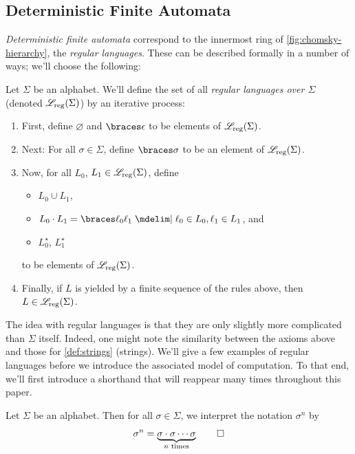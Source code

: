 \documentclass{fkpaper}
\newcommand{\lreg}{\ensuremath{\ms L_{\rm reg}}}
\begin{document}
\begin{multicols}{2}
\subsection{Deterministic Finite Automata}
\emph{Deterministic finite automata} correspond to the innermost ring
of \cref{fig:chomsky-hierarchy}, the \emph{regular languages}. These
can be described formally in a number of ways; we'll choose the
following:
\begin{definition}\label{def:regular-language}
  Let $\Sigma$ be an alphabet. We'll define the set of all
  \emph{regular languages over $\Sigma$} (denoted $\lreg(\Sigma)$) by
  an iterative process:
  \begin{enumerate}
    \item First, define $\varnothing$ and $\set{\epsilon}$ to be
      elements of $\lreg(\Sigma)$.
    \item Next: For all $\sigma \in \Sigma$, define $\set{\sigma}$ to
      be an element of $\lreg(\Sigma)$.
    \item Now, for all $L_0$, $L_1 \in \lreg(\Sigma)$, define
      \begin{itemize}
        \item $L_0 \cup L_1$, %
        \item $L_0 \cdot L_1 = \set{\ell_0 \ell_1 \MID \ell_0 \in L_0,
          \ell_1 \in L_1}$, and
        \item $L_0^\star$, $L_1^\star$
      \end{itemize}
      to be elements of $\lreg(\Sigma)$.
    \item Finally, if $L$ is yielded by a finite sequence of the
      rules above, then $L \in \lreg(\Sigma)$. \qedhere
  \end{enumerate}
\end{definition}
The idea with regular languages is that they are only slightly more
complicated than $\Sigma$ itself. Indeed, one might note the
similarity between the axioms above and those for \cref{def:strings}
(strings). We'll give a few examples of regular languages before we
introduce the associated model of computation. To that end, we'll
first introduce a shorthand that will reappear many times throughout
this paper.
\begin{definition}
  Let $\Sigma$ be an alphabet. Then for all $\sigma \in \Sigma$, we
  interpret the notation $\sigma^n$ by
  \[
    \sigma^n = \underbrace{\sigma \cdot \sigma \cdots \sigma}_{n\text{
      times}} \qedhere
\]
\end{definition}
\end{multicols}
\end{document}
